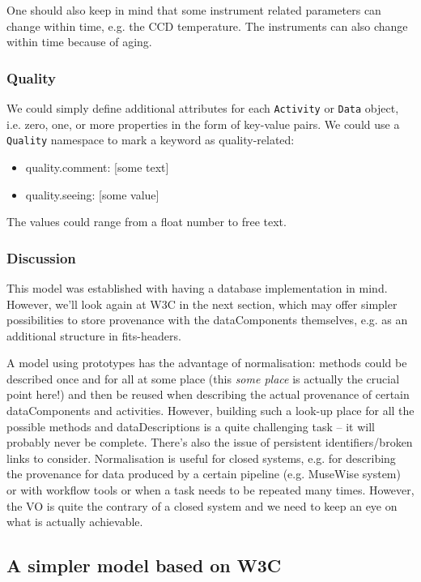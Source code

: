 \documentclass[11pt,a4paper]{ivoa}
\begin{document}
One should also keep in mind that some instrument related parameters can change within time,
e.g. the CCD temperature. The instruments can also change within time because of aging.


\subsubsection{Quality}
We could simply define additional attributes for each \texttt{Activity}
or \texttt{Data} object, i.e. zero, one, or more properties in the form of
key-value pairs. We could use a \texttt{Quality} namespace to mark a keyword
as quality-related:
\begin{itemize}
	\item quality.comment: [some text]
	\item quality.seeing: [some value]
\end{itemize}
The values could range from a float number to free text.

\subsubsection{Discussion}
This model was established with having a database implementation in mind. However, we'll look again at W3C in the next section, which may offer simpler possibilities to store provenance with the dataComponents themselves, e.g. as an additional structure in fits-headers.


A model using prototypes has the advantage of normalisation: methods could be described once and for all at some place (this \emph{some place} is actually the crucial point here!) and then be reused when describing the actual provenance of certain dataComponents and activities.
However, building such a look-up place for all the possible methods and dataDescriptions is a quite challenging task -- it will probably never be complete. There's also the issue of persistent identifiers/broken links to consider.
Normalisation is useful for closed systems, e.g. for describing the provenance for data produced by a certain pipeline (e.g. MuseWise system) or with workflow tools or when a task needs to be repeated many times. However, the VO is quite the contrary of a closed system and we need to keep an eye on what is actually achievable.


\subsection{A simpler model based on W3C}
\end{document}
